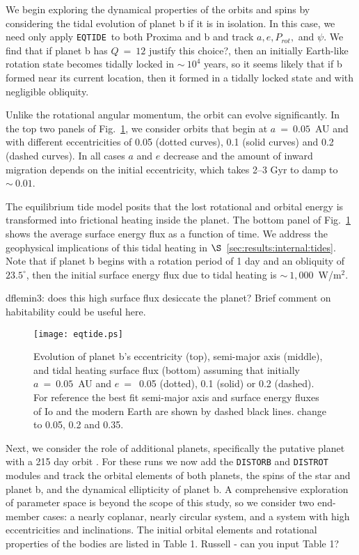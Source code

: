 \documentclass[preprint,12pt]{aastex}
\newcommand{\xxx}[1]{{\color{red} #1}} %
\newcommand{\xxx}[1]{{\color{red} #1}} %
\def\distorb{\texttt{\footnotesize{DISTORB}}\xspace}
\def\distrot{\texttt{\footnotesize{DISTROT}}\xspace}
\def\eqtide{\texttt{\footnotesize{EQTIDE}}\xspace}
\begin{document}
We begin exploring the dynamical properties of the orbits and spins by
considering the tidal evolution of planet b if it is in isolation. In
this case, we need only apply \eqtide~to both Proxima and b and track
$a, e, P_{rot},$ and $\psi$. We find that if planet b has $Q~=~12$ \xxx{justify this choice?},
then an initially Earth-like rotation state becomes tidally locked in
$\sim~10^4$ years, so it seems likely that if b formed near its
current location, then it formed in a tidally locked state and with
negligible obliquity.

Unlike the rotational angular momentum, the orbit can evolve
\xxx{significantly}. In the top two panels of Fig.~\ref{fig:eqtide}, we
consider orbits that begin at $a~=~0.05$~AU and with different
eccentricities of 0.05 (dotted curves), 0.1 (solid curves) and 0.2
(dashed curves). In all cases $a$ and $e$ decrease and the amount of
inward migration depends on the initial eccentricity, which takes 2--3
Gyr to damp to $\sim~0.01$.

The equilibrium tide model posits that the lost rotational and orbital
energy is transformed into frictional heating inside the planet. The
bottom panel of Fig.~\ref{fig:eqtide} shows the average surface energy
flux as a function of time. We address the geophysical implications of
this tidal heating in $\S$~\ref{sec:results:internal:tides}. Note that if planet
b begins with a rotation period of 1 day and an obliquity of
$23.5^\circ$, then the initial surface energy flux due to tidal
heating is $\sim~1,000$~W/m$^{2}$.

\xxx{dflemin3: does this high surface flux desiccate the planet?  Brief comment on habitability could be useful here.}

\begin{figure} 
\begin{center}
\texttt{[image: eqtide.ps]}
\end{center}
\caption{Evolution of planet b's eccentricity (top), semi-major axis (middle), and tidal heating surface flux (bottom) assuming that initially $a~=~0.05$~AU and $e~=$~0.05 (dotted), 0.1 (solid) or 0.2 (dashed). For reference the best fit semi-major axis and surface energy fluxes of Io and the modern Earth are shown by dashed black lines. \xxx{change to 0.05, 0.2 and 0.35.}}
\label{fig:eqtide}
\end{figure}

Next, we consider the role of additional planets, specifically the
putative planet with a 215 day orbit \citep{AngladaEscude16}. For
these runs we now add the \distorb and \distrot modules and track the
orbital elements of both planets, the spins of the star and planet b,
and the dynamical ellipticity of planet b. A comprehensive exploration
of parameter space is beyond the scope of this study, so we consider
two end-member cases: a nearly coplanar, nearly circular system, and a
system with high eccentricities and inclinations. The initial orbital
elements and rotational properties of the bodies are listed in Table
1. \xxx{Russell - can you input Table 1?}
\end{document}
